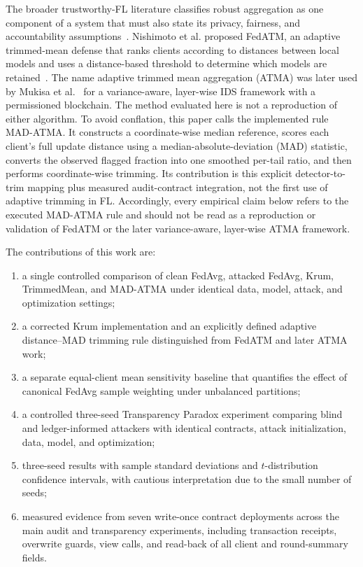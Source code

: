 \documentclass[10pt,letterpaper]{article}
\begin{document}
The broader trustworthy-FL literature classifies robust aggregation as one
component of a system that must also state its privacy, fairness, and
accountability assumptions~\cite{zhang2024}.
Nishimoto et al. proposed FedATM, an adaptive trimmed-mean defense that ranks
clients according to distances between local models and uses a distance-based
threshold to determine which models are retained~\cite{nishimoto2023}. The name
adaptive trimmed mean aggregation (ATMA) was later used by Mukisa et
al.~\cite{mukisa2025} for a variance-aware, layer-wise IDS framework with a
permissioned blockchain. The method evaluated here is not a reproduction of
either algorithm. To avoid conflation, this paper calls the implemented rule
MAD-ATMA. It constructs a coordinate-wise median reference, scores each client's
full update distance using a median-absolute-deviation (MAD) statistic, converts
the observed flagged fraction into one smoothed per-tail ratio, and then performs
coordinate-wise trimming. Its contribution is this explicit detector-to-trim
mapping plus measured audit-contract integration, not the first use of adaptive
trimming in FL. Accordingly, every empirical claim below refers to the executed
MAD-ATMA rule and should not be read as a reproduction or validation of FedATM or
the later variance-aware, layer-wise ATMA framework.

The contributions of this work are:
\begin{enumerate}[leftmargin=*]
    \item a single controlled comparison of clean FedAvg, attacked FedAvg,
    Krum, TrimmedMean, and MAD-ATMA under identical data, model, attack, and
    optimization settings;
    \item a corrected Krum implementation and an explicitly defined adaptive
    distance--MAD trimming rule distinguished from FedATM and later ATMA work;
    \item a separate equal-client mean sensitivity baseline that quantifies the
    effect of canonical FedAvg sample weighting under unbalanced partitions;
    \item a controlled three-seed Transparency Paradox experiment comparing
    blind and ledger-informed attackers with identical contracts, attack
    initialization, data, model, and optimization;
    \item three-seed results with sample standard deviations and
    $t$-distribution confidence intervals, with cautious interpretation due to
    the small number of seeds;
    \item measured evidence from seven write-once contract deployments across
    the main audit and transparency experiments, including transaction receipts,
    overwrite guards, view calls, and read-back of all client and round-summary
    fields.
\end{enumerate}
\end{document}
